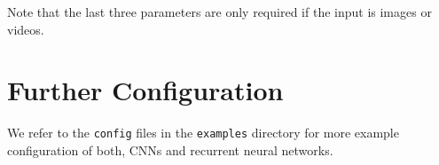 Note that the last three parameters are only required if the input is images or videos.

\section{Further Configuration}

We refer to the \texttt{config} files in the \texttt{examples} directory for more example configuration of both, CNNs and recurrent neural networks.
